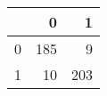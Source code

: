 \begin{tabular}{lrr}
\toprule
{} &    0 &    1 \\
\midrule
0 &  185 &    9 \\
1 &   10 &  203 \\
\bottomrule
\end{tabular}
